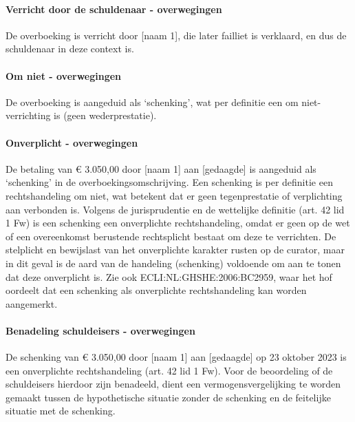 \documentclass[
  dutch,
  a4paper,
]{article}
\begin{document}
\paragraph{Verricht door de schuldenaar - overwegingen}\label{verricht-door-de-schuldenaar---overwegingen-30}

De overboeking is verricht door {[}naam 1{]}, die later failliet is verklaard, en dus de schuldenaar in deze context is.

\paragraph{Om niet - overwegingen}\label{om-niet---overwegingen-30}

De overboeking is aangeduid als `schenking', wat per definitie een om niet-verrichting is (geen wederprestatie).

\paragraph{Onverplicht - overwegingen}\label{onverplicht---overwegingen-30}

De betaling van € 3.050,00 door {[}naam 1{]} aan {[}gedaagde{]} is aangeduid als `schenking' in de overboekingsomschrijving. Een schenking is per definitie een rechtshandeling om niet, wat betekent dat er geen tegenprestatie of verplichting aan verbonden is. Volgens de jurisprudentie en de wettelijke definitie (art. 42 lid 1 Fw) is een schenking een onverplichte rechtshandeling, omdat er geen op de wet of een overeenkomst berustende rechtsplicht bestaat om deze te verrichten. De stelplicht en bewijslast van het onverplichte karakter rusten op de curator, maar in dit geval is de aard van de handeling (schenking) voldoende om aan te tonen dat deze onverplicht is. Zie ook ECLI:NL:GHSHE:2006:BC2959, waar het hof oordeelt dat een schenking als onverplichte rechtshandeling kan worden aangemerkt.

\paragraph{Benadeling schuldeisers - overwegingen}\label{benadeling-schuldeisers---overwegingen-30}

De schenking van € 3.050,00 door {[}naam 1{]} aan {[}gedaagde{]} op 23 oktober 2023 is een onverplichte rechtshandeling (art. 42 lid 1 Fw). Voor de beoordeling of de schuldeisers hierdoor zijn benadeeld, dient een vermogensvergelijking te worden gemaakt tussen de hypothetische situatie zonder de schenking en de feitelijke situatie met de schenking.
\end{document}
